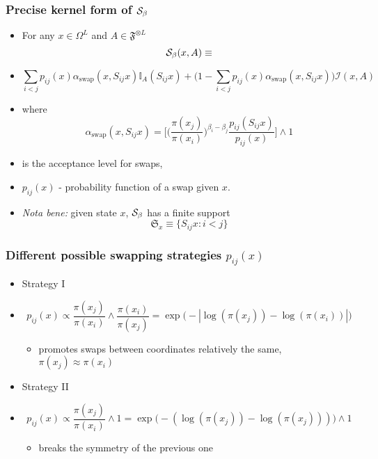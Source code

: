 \begin{frame}
		\frametitle{ Precise kernel form of $\mathcal{S}_{\beta}$}

	\begin{itemize}
		\item[] For any $x \in \Omega^L$ and $A \in \mathfrak{F}^{\otimes L}$ 
	$$\mathcal{S}_{\beta}(x, A) \equiv$$
		\item[]
$$\underset{ i < j}{\sum} p_{ij}(x) \alpha_\text{swap} (x, S_{ij}x) \mathbb{I}_A(S_{ij} x) + \Big( 1 - \underset{ i < j}{\sum} p_{ij}(x) \alpha_\text{swap} (x, S_{ij}x)\Big) \mathcal{I}(x,A)$$

		\item[] where 
$$\alpha_\text{swap}(x,S_{ij} x) = \Big[  \Big(\frac{\pi(x_j)}{\pi(x_i)} \Big)^{\beta_i - \beta_j}  \frac{ p_{ij}(S_{ij} x )}{ p_{ij}( x ) }\Big] \wedge 1$$
		\item[] is the acceptance level for swaps, 
		\item[] $p_{ij}( x )$ - probability function of a swap given $x$. 
		\item[] \emph{Nota bene:} given state $x$, $\mathcal{S}_{\beta}$ has a finite support 
	$$\mathfrak{S}_x \equiv\{ S_{ij} x : i <j \}$$
	\end{itemize}

\end{frame}

\begin{frame}
		\frametitle{ Different possible swapping strategies $p_{ij}( x )$ }

	\begin{itemize}
		\item[] Strategy I 
		\item[] 
	$$p_{ij}(x) \propto \frac{\pi (x_j)}{\pi( x_i )} \wedge \frac{\pi (x_i)}{\pi( x_j )} = \exp \Big( - | \log ( \pi(x_j) ) - \log ( \pi(x_i) ) | \Big)$$
		\begin{itemize}		
 			\item promotes swaps between coordinates relatively the same,  $\pi (x_j) \approx \pi (x_i)$ 
		\end{itemize}
	
		\item[] Strategy II 
		\item[] 
	$$p_{ij}(x) \propto \frac{\pi (x_j)}{\pi (x_i)} \wedge 1 = \exp \Big( - ( \log ( \pi(x_j) ) - \log ( \pi(x_j) ) )\Big) \wedge 1$$
		\begin{itemize}		
 			\item breaks the symmetry of the previous one
		\end{itemize}

	\end{itemize}

\end{frame}


